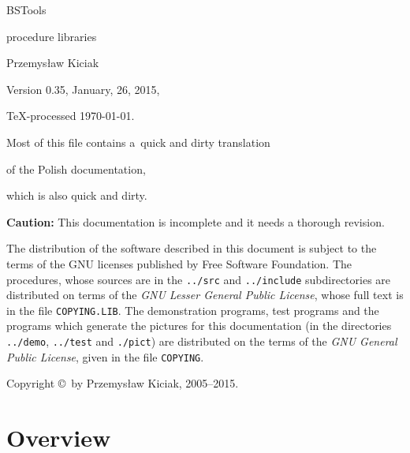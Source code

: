 

\thispagestyle{empty}
\vspace*{4.0cm}
\centerline{\Huge BSTools}
\vspace{0.75cm}
\centerline{\Huge procedure libraries}
\vspace{1.0cm}
\centerline{\Large Przemys{\l}aw Kiciak}
\vspace{1.0cm}
\centerline{\large Version 0.35, January, 26, 2015,}
\vspace{\smallskipamount}
\centerline{\large\TeX-processed \today.}

\vspace{1.0cm}
\centerline{Most of this file contains a~quick and dirty translation}
\centerline{of the Polish documentation,}
\centerline{which is also quick and dirty.}

\vspace{1.0cm}
\noindent
\textbf{Caution:} This documentation is incomplete
and it needs a thorough revision.

\newpage
\thispagestyle{empty}
\vspace*{\fill}
\noindent
The distribution of the software described in this document is subject
to the terms of the GNU licenses published by Free Software Foundation.
The procedures, whose sources are in the 
\texttt{../src} and \texttt{../include} subdirectories are distributed
on terms of the \textsl{GNU Lesser General Public License}, whose full text
is in the file \texttt{COPYING.LIB}. The demonstration programs, test programs
and the programs which generate the pictures for this documentation
(in the directories \texttt{../demo}, \texttt{../test} and \texttt{./pict})
are distributed on the terms of the \textsl{GNU General Public License},
given in the file \texttt{COPYING}.

\vspace{\bigskipamount}
\noindent
Copyright \copyright\ by Przemys{\l}aw Kiciak, 2005--2015.

\vspace*{\fill}

\tableofcontents

\chapter{Overview}

